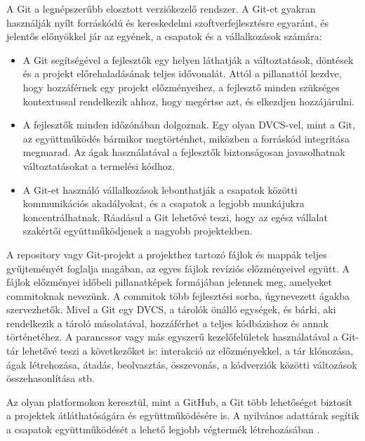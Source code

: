A Git a legnépszerűbb elosztott verziókezelő rendszer. A Git-et gyakran használják nyílt forráskódú és kereskedelmi szoftverfejlesztésre egyaránt, és jelentős előnyökkel jár az egyének, a csapatok és a vállalkozások számára:
\begin{itemize}
  \item A Git segítségével a fejlesztők egy helyen láthatják a változtatások, döntések és a projekt előrehaladásának teljes idővonalát. Attól a pillanattól kezdve, hogy hozzáférnek egy projekt előzményeihez, a fejlesztő minden szükséges kontextussal rendelkezik ahhoz, hogy megértse azt, és elkezdjen hozzájárulni.
  \item A fejlesztők minden időzónában dolgoznak. Egy olyan DVCS-vel, mint a Git, az együttműködés bármikor megtörténhet, miközben a forráskód integritása megmarad. Az ágak használatával a fejlesztők biztonságosan javasolhatnak változtatásokat a termelési kódhoz.
  \item A Git-et használó vállalkozások lebonthatják a csapatok közötti kommunikációs akadályokat, és a csapatok a legjobb munkájukra koncentrálhatnak. Ráadásul a Git lehetővé teszi, hogy az egész vállalat szakértői együttműködjenek a nagyobb projektekben.
\end{itemize}

A repository vagy Git-projekt a projekthez tartozó fájlok és mappák teljes gyűjteményét foglalja magában, az egyes fájlok revíziós előzményeivel együtt.
A fájlok előzményei időbeli pillanatképek formájában jelennek meg, amelyeket commitoknak nevezünk.
A commitok több fejlesztési sorba, úgynevezett ágakba szervezhetők. Mivel a Git egy DVCS, a tárolók önálló egységek, és bárki, aki rendelkezik a tároló másolatával, hozzáférhet a teljes kódbázishoz és annak történetéhez.
A parancssor vagy más egyszerű kezelőfelületek használatával a Git-tár lehetővé teszi a következőket is: interakció az előzményekkel, a tár klónozása, ágak létrehozása, átadás, beolvasztás, összevonás, a kódverziók közötti változások összehasonlítása stb.

Az olyan platformokon keresztül, mint a GitHub, a Git több lehetőséget biztosít a projektek átláthatóságára és együttműködésére is.
A nyilvános adattárak segítik a csapatok együttműködését a lehető legjobb végtermék létrehozásában \cite{git}.

